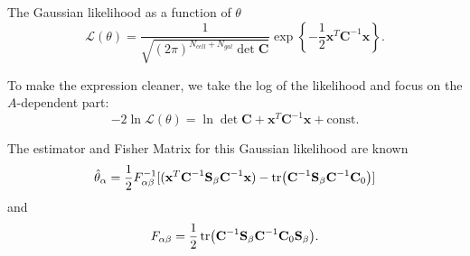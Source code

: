 \documentclass{article}
\begin{document}
The Gaussian likelihood as a function of $\theta$
\[
\mathcal{L}(\theta) = \frac{1}{\sqrt{\left(2\pi\right)^{N_{cell}+N_{gal}} \det \textbf{C}}}\exp\left\{-\frac{1}{2}\textbf{x}^T\textbf{C}^{-1}\textbf{x}\right\}.
\]\par
To make the expression cleaner, we take the log of the likelihood and focus on the $A$-dependent part:
\begin{equation}
-2\ln\mathcal{L}(\theta) = \ln\det\textbf{C} + \textbf{x}^T\textbf{C}^{-1}\textbf{x} + \text{const}.
\label{log:eqn}
\end{equation}

The estimator and Fisher Matrix for this Gaussian likelihood are known
\begin{equation}
\hat{\theta}_\alpha = \frac{1}{2} F^{-1}_{\alpha \beta} [(\textbf{x}^T \textbf{C}^{-1} \textbf{S}_\beta \textbf{C}^{-1} \textbf{x}) - \tr(\textbf{C}^{-1} \textbf{S}_\beta \textbf{C}^{-1} \textbf{C}_0)]
\end{equation}
and
\begin{equation}
F_{\alpha\beta} = \frac{1}{2} \tr(\textbf{C}^{-1} \textbf{S}_\beta \textbf{C}^{-1} \textbf{C}_0 \textbf{S}_\beta).
\end{equation}
\end{document}
